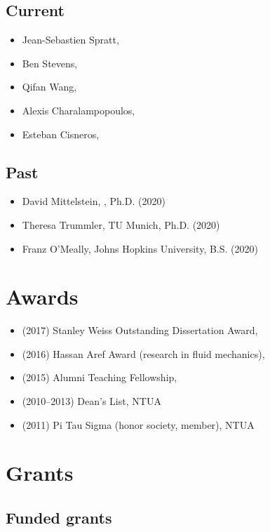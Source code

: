 \subsection{Current}

\begin{itemize}
    \item Jean-Sebastien Spratt, \CIT
    \item Ben Stevens, \CIT
    \item Qifan Wang, \CIT
    \item Alexis Charalampopoulos, \MIT
    \item Esteban Cisneros, \UIUC
\end{itemize}

\subsection{Past}

\begin{itemize}
    \item David Mittelstein, \CIT, Ph.D. (2020)
    \item Theresa Trummler, TU Munich, Ph.D. (2020)
    \item Franz O'Meally, Johns Hopkins University, B.S. (2020)
\end{itemize}

\section{Awards}

\begin{itemize}
    \item (2017) Stanley Weiss Outstanding Dissertation Award, \UIUC
    \item (2016) Hassan Aref Award (research in fluid mechanics), \UIUC
    \item (2015) Alumni Teaching Fellowship, \UIUC
    \item (2010--2013) Dean's List, NTUA
    \item (2011) Pi Tau Sigma (honor society, member), NTUA
\end{itemize}

\section{Grants}

\subsection{Funded grants}

